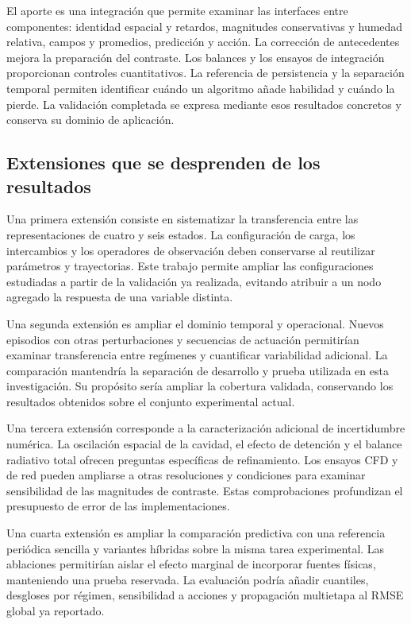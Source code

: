 El aporte es una integración que permite examinar las interfaces entre componentes: identidad espacial y retardos, magnitudes conservativas y humedad relativa, campos y promedios, predicción y acción. La corrección de antecedentes mejora la preparación del contraste. Los balances y los ensayos de integración proporcionan controles cuantitativos. La referencia de persistencia y la separación temporal permiten identificar cuándo un algoritmo añade habilidad y cuándo la pierde. La validación completada se expresa mediante esos resultados concretos y conserva su dominio de aplicación.

\subsection{Extensiones que se desprenden de los resultados}

Una primera extensión consiste en sistematizar la transferencia entre las representaciones de cuatro y seis estados. La configuración de carga, los intercambios y los operadores de observación deben conservarse al reutilizar parámetros y trayectorias. Este trabajo permite ampliar las configuraciones estudiadas a partir de la validación ya realizada, evitando atribuir a un nodo agregado la respuesta de una variable distinta.

Una segunda extensión es ampliar el dominio temporal y operacional. Nuevos episodios con otras perturbaciones y secuencias de actuación permitirían examinar transferencia entre regímenes y cuantificar variabilidad adicional. La comparación mantendría la separación de desarrollo y prueba utilizada en esta investigación. Su propósito sería ampliar la cobertura validada, conservando los resultados obtenidos sobre el conjunto experimental actual.

Una tercera extensión corresponde a la caracterización adicional de incertidumbre numérica. La oscilación espacial de la cavidad, el efecto de detención y el balance radiativo total ofrecen preguntas específicas de refinamiento. Los ensayos CFD y de red pueden ampliarse a otras resoluciones y condiciones para examinar sensibilidad de las magnitudes de contraste. Estas comprobaciones profundizan el presupuesto de error de las implementaciones.

Una cuarta extensión es ampliar la comparación predictiva con una referencia periódica sencilla y variantes híbridas sobre la misma tarea experimental. Las ablaciones permitirían aislar el efecto marginal de incorporar fuentes físicas, manteniendo una prueba reservada. La evaluación podría añadir cuantiles, desgloses por régimen, sensibilidad a acciones y propagación multietapa al RMSE global ya reportado.

